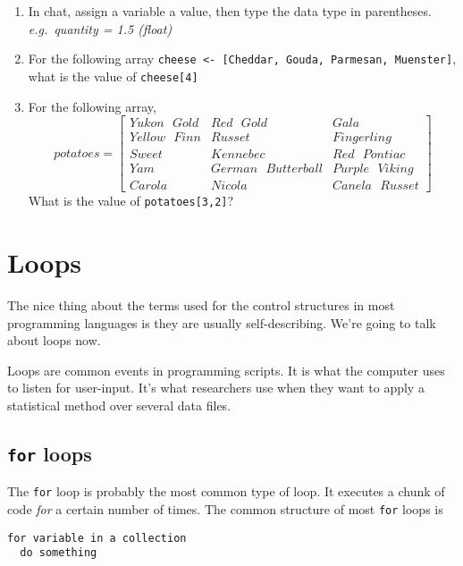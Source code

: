 \documentclass[
]{book}
\providecommand{\tightlist}{%
  \setlength{\itemsep}{0pt}\setlength{\parskip}{0pt}}
\begin{document}
\begin{enumerate}
\def\labelenumi{\arabic{enumi}.}
\tightlist
\item
  In chat, assign a variable a value, then type the data type in parentheses. \emph{e.g.~quantity = 1.5 (float)}
\item
  For the following array \texttt{cheese\ \textless{}-\ {[}Cheddar,\ Gouda,\ Parmesan,\ Muenster{]}}, what is the value of \texttt{cheese{[}4{]}}
\item
  For the following array, \begin{equation}
  potatoes =
  \begin{bmatrix}
  Yukon\text{ }Gold & Red\text{ }Gold & Gala \\
  Yellow\text{ }Finn & Russet & Fingerling \\
  Sweet & Kennebec & Red\text{ }Pontiac \\
  Yam & German\text{ }Butterball & Purple\text{ }Viking \\
  Carola & Nicola & Canela\text{ }Russet
  \end{bmatrix}
  \end{equation}What is the value of \texttt{potatoes{[}3,2{]}}?
\end{enumerate}

\chapter{Loops}\label{loops}

The nice thing about the terms used for the control structures in most programming languages is they are usually self-describing. We're going to talk about loops now.

Loops are common events in programming scripts. It is what the computer uses to listen for user-input. It's what researchers use when they want to apply a statistical method over several data files.

\section{\texorpdfstring{\texttt{for} loops}{for loops}}\label{for-loops}

The \texttt{for} loop is probably the most common type of loop. It executes a chunk of code \emph{for} a certain number of times. The common structure of most \texttt{for} loops is

\begin{verbatim}
for variable in a collection
  do something
\end{verbatim}
\end{document}
